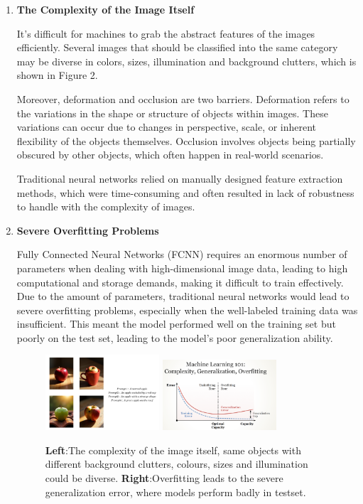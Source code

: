 \documentclass[a4paper]{article}
\begin{document}
\begin{enumerate}

\item \textbf{The Complexity of the Image Itself} 

It's difficult for machines to grab the abstract features of the images efficiently. Several images that should be classified into the same category may be diverse in colors, sizes, illumination and background clutters, which is shown in Figure 2.

Moreover, deformation and occlusion are two barriers. Deformation refers to the variations in the shape or structure of objects within images. These variations can occur due to changes in perspective, scale, or inherent flexibility of the objects themselves. Occlusion involves objects being partially obscured by other objects, which often happen in real-world scenarios.

Traditional neural networks relied on manually designed feature extraction methods, which were time-consuming and often resulted in lack of robustness to handle with the complexity of images.




\item \textbf{Severe Overfitting Problems} 

Fully Connected Neural Networks (FCNN) requires an enormous number of parameters when dealing with high-dimensional image data, leading to high computational and storage demands, making it difficult to train effectively. Due to the amount of parameters, traditional neural networks would lead to severe overfitting problems, especially when the well-labeled training data was insufficient. This meant the model performed well on the training set but poorly on the test set, leading to the model's poor generalization ability.


\begin{figure}[htb]
\centering
\includegraphics[width=0.4\textwidth,height=0.25\textwidth]{images/apple.png}
\hspace{0.01\textwidth}
\includegraphics[width=0.4\textwidth,height=0.25\textwidth]{images/Overfitting.png}
\caption{\textbf{Left}:The complexity of the image itself, same objects with different background clutters, colours, sizes and illumination could be diverse. \textbf{Right}:Overfitting leads to the severe generalization error, where models perform badly in testset.}

\end{figure}


\end{enumerate}
\end{document}
